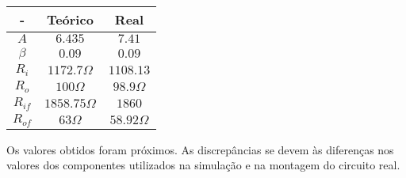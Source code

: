 \begin{table}[h]
    \centering
    \begin{tabular}{|c|c|c|}
        \hline
        \textbf{-} & \textbf{Teórico}   & \textbf{Real}     \\
        \hline
        $A$        & $6.435$            & $7.41$            \\
        \hline
        $\beta$    & $0.09$             & $0.09$            \\
        \hline
        $R_i$      & $1172.7\varOmega$  & $1108.13$         \\
        \hline
        $R_o$      & $100\varOmega$     & $98.9 \varOmega$  \\
        \hline
        $R_{if}$   & $1858.75\varOmega$ & $1860$            \\
        \hline
        $R_{of}$   & $63\varOmega$      & $58.92 \varOmega$ \\
        \hline
    \end{tabular}
\end{table}

Os valores obtidos foram próximos. As discrepâncias se devem às diferenças nos valores dos componentes utilizados na simulação e na montagem do circuito real.